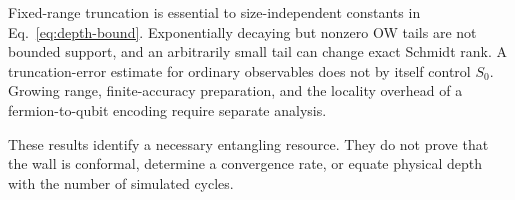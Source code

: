 \documentclass[aps,prb,onecolumn,nofootinbib,superscriptaddress]{revtex4-2}
\begin{document}
Fixed-range truncation is essential to size-independent constants in
Eq.~\eqref{eq:depth-bound}. Exponentially decaying but nonzero OW tails
are not bounded support, and an arbitrarily small tail can change exact
Schmidt rank. A truncation-error estimate for ordinary observables does not
by itself control $S_0$. Growing range, finite-accuracy preparation, and
the locality overhead of a fermion-to-qubit encoding require separate
analysis.

These results identify a necessary entangling resource. They do not prove
that the wall is conformal, determine a convergence rate, or equate physical
depth with the number of simulated cycles.


\end{document}

